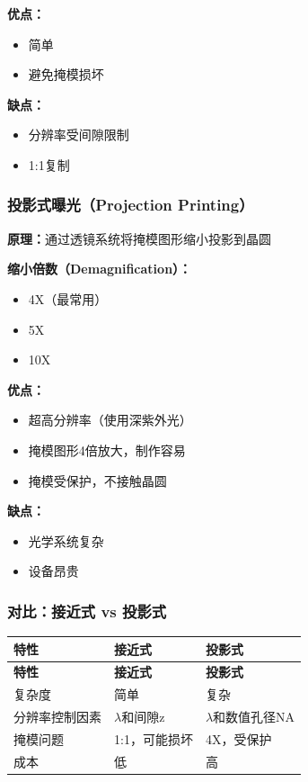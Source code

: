 \documentclass[UTF8,12pt,a4paper]{ctexart}
\begin{document}
\textbf{优点：}
\begin{itemize}
    \item 简单
    \item 避免掩模损坏
\end{itemize}

\textbf{缺点：}
\begin{itemize}
    \item 分辨率受间隙限制
    \item 1:1复制
\end{itemize}

\subsubsection{投影式曝光（Projection Printing）}

\textbf{原理：}通过透镜系统将掩模图形缩小投影到晶圆

\textbf{缩小倍数（Demagnification）：}
\begin{itemize}
    \item 4X（最常用）
    \item 5X
    \item 10X
\end{itemize}

\textbf{优点：}
\begin{itemize}
    \item 超高分辨率（使用深紫外光）
    \item 掩模图形4倍放大，制作容易
    \item 掩模受保护，不接触晶圆
\end{itemize}

\textbf{缺点：}
\begin{itemize}
    \item 光学系统复杂
    \item 设备昂贵
\end{itemize}

\subsubsection{对比：接近式 vs 投影式}

\begin{longtable}{|L{5cm}|L{5cm}|L{5cm}|}
\hline
\textbf{特性} & \textbf{接近式} & \textbf{投影式} \\
\hline
\endfirsthead
\hline
\textbf{特性} & \textbf{接近式} & \textbf{投影式} \\
\hline
\endhead
\hline
\endfoot

复杂度 & 简单 & 复杂 \\
\hline

分辨率控制因素 & $\lambda$和间隙z & $\lambda$和数值孔径NA \\
\hline

掩模问题 & 1:1，可能损坏 & 4X，受保护 \\
\hline

成本 & 低 & 高 \\
\hline

\end{longtable}
\end{document}
